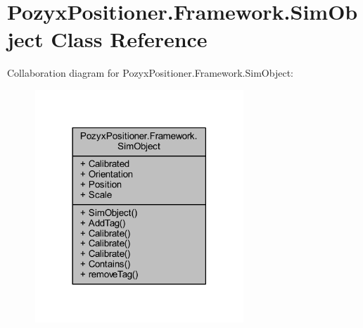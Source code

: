 \hypertarget{class_pozyx_positioner_1_1_framework_1_1_sim_object}{}\section{Pozyx\+Positioner.\+Framework.\+Sim\+Object Class Reference}
\label{class_pozyx_positioner_1_1_framework_1_1_sim_object}


Collaboration diagram for Pozyx\+Positioner.\+Framework.\+Sim\+Object\+:
\nopagebreak
\begin{figure}[H]
\begin{center}
\leavevmode
\includegraphics[width=222pt]{class_pozyx_positioner_1_1_framework_1_1_sim_object__coll__graph}
\end{center}
\end{figure}

